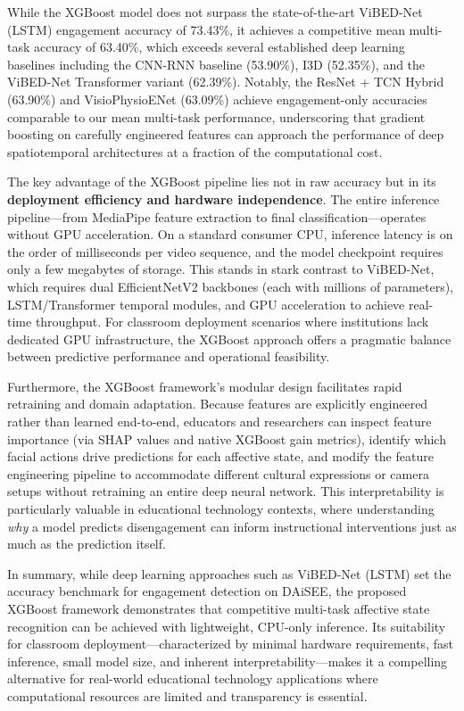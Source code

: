 While the XGBoost model does not surpass the state-of-the-art ViBED-Net (LSTM) engagement accuracy of 73.43\%, it achieves a competitive mean multi-task accuracy of 63.40\%, which exceeds several established deep learning baselines including the CNN-RNN baseline (53.90\%), I3D (52.35\%), and the ViBED-Net Transformer variant (62.39\%). Notably, the ResNet + TCN Hybrid (63.90\%) and VisioPhysioENet (63.09\%) achieve engagement-only accuracies comparable to our mean multi-task performance, underscoring that gradient boosting on carefully engineered features can approach the performance of deep spatiotemporal architectures at a fraction of the computational cost.

The key advantage of the XGBoost pipeline lies not in raw accuracy but in its \textbf{deployment efficiency and hardware independence}. The entire inference pipeline---from MediaPipe feature extraction to final classification---operates without GPU acceleration. On a standard consumer CPU, inference latency is on the order of milliseconds per video sequence, and the model checkpoint requires only a few megabytes of storage. This stands in stark contrast to ViBED-Net, which requires dual EfficientNetV2 backbones (each with millions of parameters), LSTM/Transformer temporal modules, and GPU acceleration to achieve real-time throughput. For classroom deployment scenarios where institutions lack dedicated GPU infrastructure, the XGBoost approach offers a pragmatic balance between predictive performance and operational feasibility.

Furthermore, the XGBoost framework's modular design facilitates rapid retraining and domain adaptation. Because features are explicitly engineered rather than learned end-to-end, educators and researchers can inspect feature importance (via SHAP values and native XGBoost gain metrics), identify which facial actions drive predictions for each affective state, and modify the feature engineering pipeline to accommodate different cultural expressions or camera setups without retraining an entire deep neural network. This interpretability is particularly valuable in educational technology contexts, where understanding \textit{why} a model predicts disengagement can inform instructional interventions just as much as the prediction itself.

In summary, while deep learning approaches such as ViBED-Net (LSTM) set the accuracy benchmark for engagement detection on DAiSEE, the proposed XGBoost framework demonstrates that competitive multi-task affective state recognition can be achieved with lightweight, CPU-only inference. Its suitability for classroom deployment---characterized by minimal hardware requirements, fast inference, small model size, and inherent interpretability---makes it a compelling alternative for real-world educational technology applications where computational resources are limited and transparency is essential.
